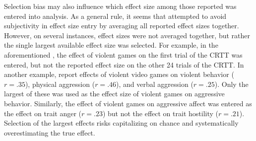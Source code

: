 \documentclass[man]{apa6}
\begin{document}
Selection bias may also influence which effect size among those reported was entered into analysis. As a general rule, it seems that \citet{Anderson:etal:2010} attempted to avoid subjectivity in effect size entry by averaging all reported effect sizes together. However, on several instances, effect sizes were not averaged together, but rather the single largest available effect size was selected. For example, in the aforementioned \citet[study 2]{Anderson:etal:2004}, the effect of violent games on the first trial of the CRTT was entered, but not the reported effect size on the other 24 trials of the CRTT. %
In another example, \citet[study 2]{Anderson:etal:2007} report effects of violent video games on violent behavior ($r = .35$), physical aggression ($r = .46$), and verbal aggression ($r = .25$). Only the largest of these was used as the effect size of violent games on aggressive behavior. %
Similarly, the effect of violent games on aggressive affect was entered as the effect on trait anger ($r = .23$) but not the effect on trait hostility ($r = .21$). Selection of the largest effects risks capitalizing on chance and systematically overestimating the true effect.
\end{document}
